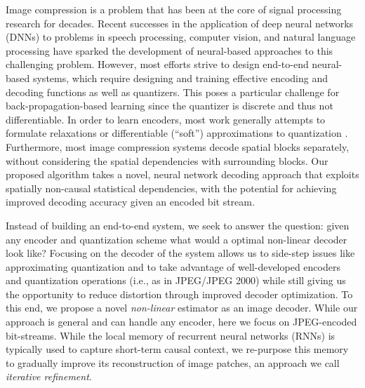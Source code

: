 \documentclass[smallabstract,smallcaptions]{dccpaper}
\begin{document}
\label{intro}
Image compression is a problem that has been at the core of signal processing research for decades.
Recent successes in the application of deep neural networks (DNNs) to problems in speech processing,  computer vision, and natural language processing have sparked the development of neural-based approaches to this challenging problem.
However, most efforts strive to design end-to-end neural-based systems, which require designing and training effective encoding and decoding functions as well as quantizers.
This poses a particular challenge for back-propagation-based learning since the quantizer is discrete and thus not differentiable.
In order to learn encoders, most work generally attempts to formulate relaxations or differentiable (``soft'') approximations to quantization \cite{agustsson2017}. %
Furthermore, most image compression systems decode spatial blocks separately, without considering the spatial dependencies with surrounding blocks. Our proposed algorithm takes a novel, neural network decoding approach that exploits spatially non-causal statistical dependencies, with the potential for achieving improved decoding accuracy
given an encoded bit stream.

Instead of building an end-to-end system, we seek to answer the question: given any encoder and quantization scheme what would a optimal non-linear decoder look like? Focusing on the decoder of the system allows us to side-step issues like approximating quantization and to take advantage of well-developed encoders and quantization operations (i.e., as in JPEG/JPEG 2000) while still giving us the opportunity to reduce distortion through improved decoder optimization.
To this end, we propose a novel \emph{non-linear} estimator as an image decoder. While our approach is general and can handle any encoder, here we focus on JPEG-encoded bit-streams.
While the local memory of recurrent neural networks (RNNs) is typically used to capture short-term causal context, we re-purpose this memory to gradually improve its reconstruction of image patches, an approach we call \emph{iterative refinement}.
\end{document}
